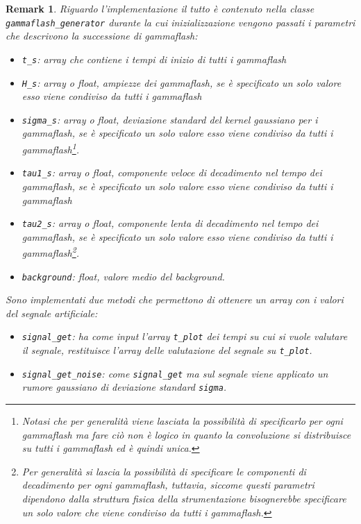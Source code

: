 \documentclass[10pt,a4paper]{report}
\newtheorem{remark}{Remark}
\begin{document}
\begin{remark}
Riguardo l'implementazione il tutto è contenuto nella classe \texttt{gammaflash\_generator} durante la cui inizializzazione vengono passati i parametri che descrivono la successione di gammaflash:
\begin{itemize}
\item \texttt{t\_s}: array che contiene i tempi di inizio di tutti i gammaflash
\item \texttt{H\_s}: array o float, ampiezze dei gammaflash, se è specificato un solo valore esso viene condiviso da tutti i gammaflash
\item \texttt{sigma\_s}: array o float, deviazione standard del kernel gaussiano per i gammaflash, se è specificato un solo valore esso viene condiviso da tutti i gammaflash\footnote{Notasi che per generalità viene lasciata la possibilità di specificarlo per ogni gammaflash ma fare ciò non è logico in quanto la convoluzione si distribuisce su tutti i gammaflash ed è quindi unica.}.
\item \texttt{tau1\_s}: array o float, componente veloce di decadimento nel tempo dei gammaflash, se è specificato un solo valore esso viene condiviso da tutti i gammaflash
\item \texttt{tau2\_s}: array o float, componente lenta di decadimento nel tempo dei gammaflash, se è specificato un solo valore esso viene condiviso da tutti i gammaflash\footnote{Per generalità si lascia la possibilità di specificare le componenti di decadimento per ogni gammaflash, tuttavia, siccome questi parametri dipendono dalla struttura fisica della strumentazione bisognerebbe specificare un solo valore che viene condiviso da tutti i gammaflash.}.
\item \texttt{background}: float, valore medio del background.
\end{itemize}
Sono implementati due metodi che permettono di ottenere un array con i valori del segnale artificiale:
\begin{itemize}
\item \texttt{signal\_get}: ha come input l'array \texttt{t\_plot} dei tempi su cui si vuole valutare il segnale, restituisce l'array delle valutazione del segnale su \texttt{t\_plot}.
\item \texttt{signal\_get\_noise}: come \texttt{signal\_get} ma sul segnale viene applicato un rumore gaussiano di deviazione standard \texttt{sigma}.
\end{itemize}
\end{remark}
\end{document}
